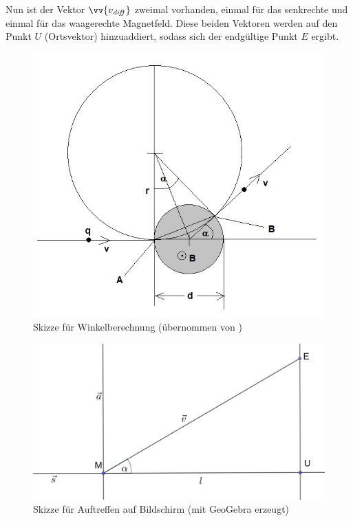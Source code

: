 Nun ist der Vektor $\vv{v_\mathit{diff}}$ zweimal vorhanden, einmal für das senkrechte und einmal für das waagerechte Magnetfeld.
Diese beiden Vektoren werden auf den Punkt $U$ (Ortsvektor) hinzuaddiert, sodass sich der endgültige Punkt $E$ ergibt.
\begin{figure}
    \centering
    \includegraphics[width=.75\textwidth]{fig/elektronenstrahl-ablenkung_101.jpg}
    \caption{Skizze für Winkelberechnung (übernommen von \cite{Blog})}
    \label{fig:ausBlog}
\end{figure}

\begin{figure}
    \centering
    \includegraphics[width=.75\textwidth]{fig/Bildschirm_Skizze.png}
    \caption{Skizze für Auftreffen auf Bildschirm (mit GeoGebra erzeugt)}
    \label{fig:Schirm}
\end{figure}



